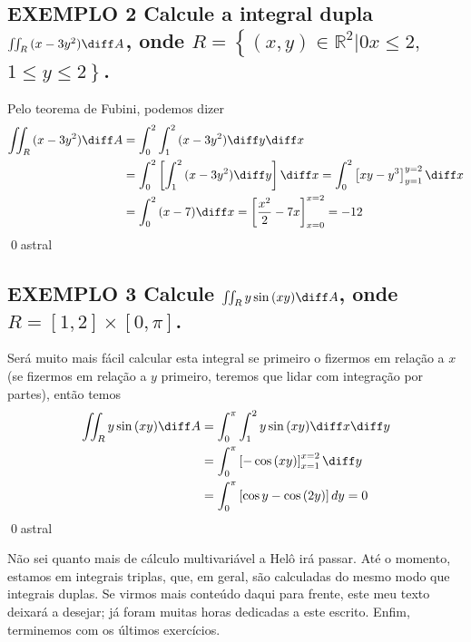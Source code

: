 \documentclass[a4paper, 12pt]{extreport}
\begin{document}
        \subsection*{\small {\color{astral}EXEMPLO 2} \textmd{
          Calcule a integral dupla $\iint_R{(x-3y^2)\diff A}$, onde $R = \left\{(x,y) \in \mathbb{R}^2 | 0 x \leqslant 2,\right.$\\$\left.1 \leqslant y \leqslant 2\right\}$.}
        }
          Pelo teorema de Fubini, podemos dizer
          \begin{equation*}
            \begin{split}
              \iint_R{(x-3y^2)\diff A} & = \int_0^2{\int_1^2{(x-3y^2)\diff y}\diff x} \\
                                       & = \int_0^2{\left[\int_1^2{(x-3y^2)\diff y}\right]\diff x} = \int_0^2{\left[xy-y^3\right]_{y=1}^{y=2}\diff x} \\
                                       & = \int_0^2{(x-7)\diff x} = \left[\frac{x^2}{2}-7x\right]_{x=0}^{x=2} = -12
            \end{split}
          \end{equation*}
      \qed{astral}

      \subsection*{\small {\color{astral}EXEMPLO 3} \textmd{Calcule $\iint_R{y\sin{(xy)}\diff A}$, onde $R = [1,2] \times [0,\pi]$.}}
        Será muito mais fácil calcular esta integral se primeiro o fizermos em relação a $x$ (se fizermos em relação a $y$ primeiro, teremos que lidar
        com integração por partes), então temos
        \begin{equation*}
          \begin{split}
            \iint_R{y\sin{(xy)}\diff A} & = \int_0^{\pi}{\int_1^2{y\sin{(xy)}\diff x}\diff y} \\
                                        & = \int_0^{\pi}{\left[-\cos{(xy)}\right]_{x=1}^{x=2}\diff y} \\
                                        & = \int_0^{\pi}{\left[\cos{y}-\cos{(2y)}\right]dy} = 0
          \end{split}
        \end{equation*}
      \qed{astral}

      Não sei quanto mais de cálculo multivariável a Helô irá passar. Até o momento, estamos em integrais triplas, que, em geral, são calculadas do mesmo
      modo que integrais duplas. Se virmos mais conteúdo daqui para frente, este meu texto deixará a desejar; já foram muitas horas dedicadas a este escrito.
      Enfim, terminemos com os últimos exercícios.
\end{document}
